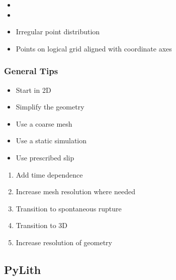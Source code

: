 \documentclass[aspectratio=169]{beamer}
\begin{document}
\begin{frame}[t]
\begin{enumerate}
\begin{onlyenv}
\begin{enumerate}
        \begin{itemize}
        \item {}
        \item {}
        \item {} Irregular point distribution
        \item {} Points on logical grid aligned with coordinate axes
        \end{itemize}
      \end{enumerate}
    \end{onlyenv}
  \end{enumerate}
  
\end{frame}

\begin{frame}
  \frametitle{General Tips}
  \summary{}

  \begin{itemize}
    \begin{itemize}
    \item Start in 2D
    \item Simplify the geometry
    \item Use a coarse mesh
    \item Use a static simulation
    \item Use prescribed slip
    \end{itemize}
    \begin{enumerate}
    \item Add time dependence
    \item Increase mesh resolution where needed
    \item Transition to spontaneous rupture
    \item Transition to 3D
    \item Increase resolution of geometry
    \end{enumerate}
  \end{itemize}
  
\end{frame}


\subsection{PyLith}
\end{document}
